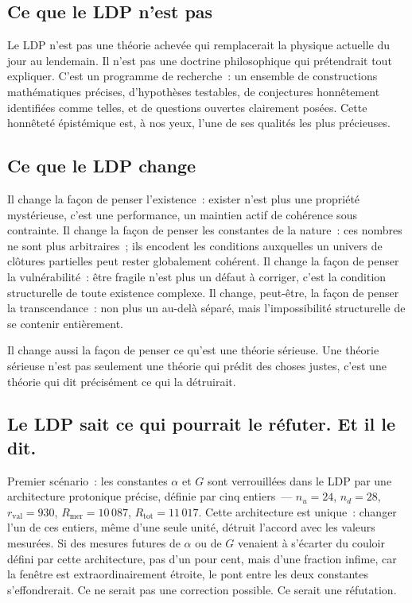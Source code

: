 \documentclass[12pt, a4paper, openright]{book}
\begin{document}
\subsection*{Ce que le LDP n'est pas}

Le LDP n'est pas une théorie achevée qui remplacerait la physique actuelle du jour au lendemain. Il n'est pas une doctrine philosophique qui prétendrait tout expliquer. C'est un programme de recherche~: un ensemble de constructions mathématiques précises, d'hypothèses testables, de conjectures honnêtement identifiées comme telles, et de questions ouvertes clairement posées. Cette honnêteté épistémique est, à nos yeux, l'une de ses qualités les plus précieuses.

\subsection*{Ce que le LDP change}

Il change la façon de penser l'existence~: exister n'est plus une propriété mystérieuse, c'est une performance, un maintien actif de cohérence sous contrainte. Il change la façon de penser les constantes de la nature~: ces nombres ne sont plus arbitraires~; ils encodent les conditions auxquelles un univers de clôtures partielles peut rester globalement cohérent. Il change la façon de penser la vulnérabilité~: être fragile n'est plus un défaut à corriger, c'est la condition structurelle de toute existence complexe. Il change, peut-être, la façon de penser la transcendance~: non plus un au-delà séparé, mais l'impossibilité structurelle de se contenir entièrement. 

\medskip

Il change aussi la façon de penser ce qu'est une théorie sérieuse. Une théorie sérieuse n'est pas seulement une théorie qui prédit des choses justes, c'est une théorie qui dit précisément ce qui la détruirait.

\subsection*{Le LDP sait ce qui pourrait le réfuter. Et il le dit.}

Premier scénario~: les constantes $\alpha$ et $G$ sont verrouillées dans le LDP par une architecture protonique précise, définie par cinq entiers~--- $n_u = 24$, $n_d = 28$, $r_\text{val} = 930$, $R_\text{mer} = 10\,087$, $R_\text{tot} = 11\,017$. Cette architecture est unique~: changer l'un de ces entiers, même d'une seule unité, détruit l'accord avec les valeurs mesurées. Si des mesures futures de $\alpha$ ou de $G$ venaient à s'écarter du couloir défini par cette architecture, pas d'un pour cent, mais d'une fraction infime, car la fenêtre est extraordinairement étroite, le pont entre les deux constantes s'effondrerait. Ce ne serait pas une correction possible. Ce serait une réfutation.
\end{document}
